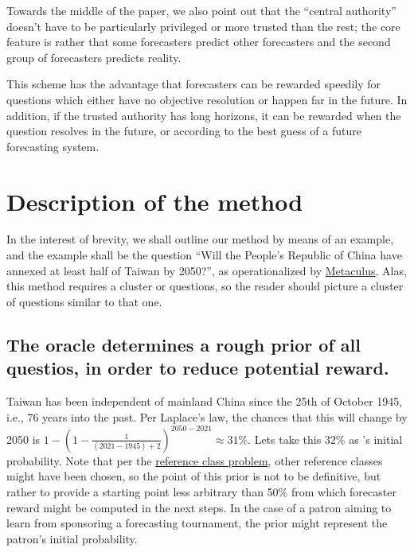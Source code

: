 \documentclass[]{article}
\begin{document}
Towards the middle of the paper, we also point out that the ``central
authority'' doesn't have to be particularly privileged or more trusted
than the rest; the core feature is rather that some forecasters predict
other forecasters and the second group of forecasters predicts reality.

This scheme has the advantage that forecasters can be rewarded speedily
for questions which either have no objective resolution or happen far in
the future. In addition, if the trusted authority has long horizons, it
can be rewarded when the question resolves in the future, or according
to the best guess of a future forecasting system.

\hypertarget{description-of-the-method}{%
\section{Description of the method}\label{description-of-the-method}}

In the interest of brevity, we shall outline our method by means of an
example, and the example shall be the question ``Will the People's
Republic of China have annexed at least half of Taiwan by 2050?'', as
operationalized by
\href{https://www.metaculus.com/questions/5320/chinese-annexation-of-most-of-taiwan-by-2050/}{Metaculus}.
Alas, this method requires a cluster or questions, so the reader should
picture a cluster of questions similar to that one.

\hypertarget{the-oracle-determines-a-rough-prior-of-all-questios-in-order-to-reduce-potential-reward.}{%
\subsection{The oracle determines a rough prior of all questios, in
order to reduce potential
reward.}\label{the-oracle-determines-a-rough-prior-of-all-questios-in-order-to-reduce-potential-reward.}}

Taiwan has been independent of mainland China since the 25th of October
1945, i.e., 76 years into the past. Per Laplace's law, the chances that
this will change by 2050 is
\(1-(1-\frac{1}{(2021-1945)+2})^{2050-2021} \approx 31\%\). Lets take
this \(32\%\) as 's initial probability. Note that per the
\href{https://en.wikipedia.org/wiki/Reference_class_problem}{reference
class problem}, other reference classes might have been chosen, so the
point of this prior is not to be definitive, but rather to provide a
starting point less arbitrary than 50\% from which forecaster reward
might be computed in the next steps. In the case of a patron aiming to
learn from sponsoring a forecasting tournament, the prior might
represent the patron's initial probability.
\end{document}
